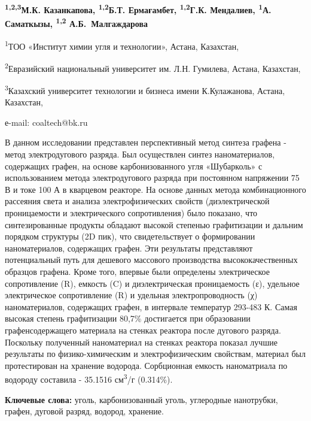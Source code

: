 
\begin{center}
{\bfseries \textsuperscript{1,2,3}М.К. Казанкапова,
\textsuperscript{1,2}Б.Т. Ермағамбет\envelope, \textsuperscript{1,2}Г.К.
Мендалиев, \textsuperscript{1}А. Саматкызы, \textsuperscript{1,2} А.Б.~Малгаждарова}

\textsuperscript{1}ТОО «Институт химии угля и технологии», Астана,
Казахстан,

\textsuperscript{2}Евразийский национальный университет им. Л.Н.
Гумилева, Астана, Казахстан,

\textsuperscript{3}Казахский университет технологии и бизнеса имени
К.Кулажанова, Астана, Казахстан,

е-mail: coaltech@bk.ru
\end{center}

В данном исследовании представлен перспективный метод синтеза графена -
метод электродугового разряда. Был осуществлен синтез наноматериалов,
содержащих графен, на основе карбонизованного угля «Шубарколь» с
использованием метода электродугового разряда при постоянном напряжении
75 В и токе 100 А в кварцевом реакторе. На основе данных метода
комбинационного рассеяния света и анализа электрофизических свойств
(диэлектрической проницаемости и электрического сопротивления) было
показано, что синтезированные продукты обладают высокой степенью
графитизации и дальним порядком структуры (2D пик), что свидетельствует
о формировании наноматериалов, содержащих графен. Эти результаты
представляют потенциальный путь для дешевого массового производства
высококачественных образцов графена. Кроме того, впервые были определены
электрическое сопротивление (R), емкость (C) и диэлектрическая
проницаемость (ε), удельное электрическое сопротивление (R) и удельная
электропроводность (χ) наноматериалов, содержащих графен, в интервале
температур 293-483 К. Самая высокая степень графитизации 80,7\%
достигается при образовании графенсодержащего материала на стенках
реактора после дугового разряда. Поскольку полученный наноматериал на
стенках реактора показал лучшие результаты по физико-химическим и
электрофизическим свойствам, материал был протестирован на хранение
водорода. Сорбционная емкость наноматриала по водороду составила -
35.1516 см\textsuperscript{3}/г (0.314\%).

{\bfseries Ключевые слова:} уголь, карбонизованный уголь, углеродные
нанотрубки, графен, дуговой разряд, водород, хранение.


